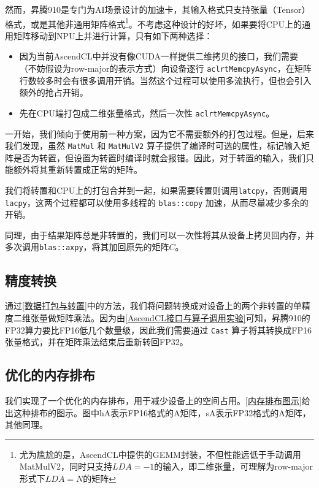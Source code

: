 然而，昇腾910是专门为AI场景设计的加速卡，其输入格式只支持张量（Tensor）格式，或是其他非通用矩阵格式\footnote{尤为尴尬的是，AscendCL中提供的GEMM封装，不但性能远低于手动调用MatMulV2，同时只支持$LDA=-1$的输入，即二维张量，可理解为row-major形式下$\mathit{LDA}=N$的矩阵}。不考虑这种设计的好坏，如果要将CPU上的通用矩阵移动到NPU上并进行计算，只有如下两种选择：

\begin{itemize}
    \item 因为当前AscendCL中并没有像CUDA一样提供二维拷贝的接口，我们需要（不妨假设为row-major的表示方式）向设备逐行 \lstinline{aclrtMemcpyAsync}，在矩阵行数较多时会有很多调用开销。当然这个过程可以使用多流执行，但也会引入额外的抢占开销。
    \item 先在CPU端打包成二维张量格式，然后一次性 \lstinline{aclrtMemcpyAsync}。
\end{itemize}

一开始，我们倾向于使用前一种方案，因为它不需要额外的打包过程。但是，后来我们发现，虽然 \lstinline{MatMul} 和 \lstinline{MatMulV2} 算子提供了编译时可选的属性，标记输入矩阵是否为转置，但设置为转置时编译时就会报错。因此，对于转置的输入，我们只能额外将其重新转置成正常的矩阵。

我们将转置和CPU上的打包合并到一起，如果需要转置则调用\lstinline{latcpy}，否则调用\lstinline{lacpy}，这两个过程都可以使用多线程的 \lstinline{blas::copy} 加速，从而尽量减少多余的开销。

同理，由于结果矩阵总是非转置的，我们可以一次性将其从设备上拷贝回内存，并多次调用\lstinline{blas::axpy}，将其加回原先的矩阵$C$。

\subsection{精度转换}

通过\autoref{数据打包与转置}中的方法，我们将问题转换成对设备上的两个非转置的单精度二维张量做矩阵乘法。因为由\autoref{AscendCL接口与算子调用实验}可知，昇腾910的FP32算力要比FP16低几个数量级，因此我们需要通过 \lstinline{Cast} 算子将其转换成FP16张量格式，并在矩阵乘法结束后重新转回FP32。

\subsection{优化的内存排布}

我们实现了一个优化的内存排布，用于减少设备上的空间占用。\autoref{内存排布图示}给出这种排布的图示。图中hA表示FP16格式的A矩阵，sA表示FP32格式的A矩阵，其他同理。

